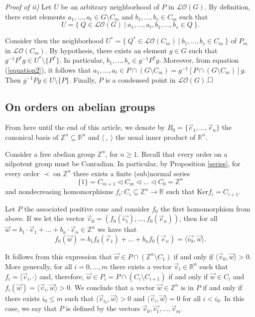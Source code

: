 \documentclass[12pt]{article}
\theoremstyle{definition}
\begin{document}
    \textit{Proof of ii)} Let $U$ be an arbitrary neighborhood of $P$ in $\mathcal{LO}(G)$. By definition, there exist elements $a_1,\dots, a_t\in G\setminus C_m$ and $b_1,\dots, b_s\in C_m$ such that
    $$U=\{\ Q\in \mathcal{LO}(G)\ |\ a_1,\dots, a_t,b_1,\dots, b_s\in Q\ \}.$$

    Consider then the neighborhood $U^*=\{\ Q^*\in\mathcal{LO}(C_m)\ |\ b_1,\dots, b_s\in C_m\ \}$ of $P_m$ in $\mathcal{LO}(C_m)$. 
    By hypothesis, there exists an element $g\in G$ such that $g^{-1}P^*g\in U^*\setminus\{P^*\}$. In particular, $b_1,\dots, b_s\in g^{-1}P^*g$.     
    Moreover, from equation (\ref{equation2}), it follows that $a_1,\dots, a_t\in P\cap (G\setminus C_m)=g^{-1}[P\cap(G\setminus C_m) ]g$. Then $g^{-1}Pg\in U\setminus\{P\}$. Finally, $P$ is a condensed point in $\mathcal{LO}(G)$.$\hfill\square$

\subsection{On orders on abelian groups}

\indent From here until the end of this article, we denote by $B_0=\{\vec{e}_1,\dots, \vec{e}_n\}$ the canonical basis of $\mathbb{Z}^n\subseteq \mathbb{R}^n$ and $\langle\ ,\ \rangle$ the usual inner product of $\mathbb{R}^n$.

Consider a free abelian group $\mathbb{Z}^n$, for $n\geq1$. 
Recall that every order on a nilpotent group must be Conradian. In particular, by Proposition \ref{series}, for every order $\prec$ on $\mathbb{Z}^n$ there exists a finite (sub)normal series $$\{1\}=C_{m+1}\vartriangleleft C_m\vartriangleleft\dots \vartriangleleft  C_0=\mathbb{Z}^n$$
and nondecreasing homomorphisms $f_i:C_i\subseteq \mathbb{Z}^n\rightarrow \mathbb{R}$ such that Ker$f_i=C_{i+1}$.

Let $P$ the associated positive cone and consider $f_0$ the first homomorphism from above. If we let the vector $\vec{v}_0=(f_0(\vec{e_1}),\dots, f_0(\vec{e}_n))$, then for all $\vec{w}=b_1\cdot\vec{e}_1+\dots+ b_n\cdot \vec{e}_n\in \mathbb{Z}^n$ we have that
$$f_0(\vec{w})=b_1f_0(\vec{e}_1)+\dots + b_nf_0(\vec{e}_n)=\langle\vec{v_0},\vec{w}\rangle.$$

It follows from this expression that $\vec{w}\in P\cap (\mathbb{Z}^n\setminus C_1)$ if and only if $\langle\vec{v}_0,\vec{w}\rangle>0$.
More generally, for all $i=0,\dots, m$ there exists a vector $\vec{v}_i\in \mathbb{R}^n$ such that $f_i=\langle\vec{v}_i, \cdot\rangle$ and, therefore, $\vec{w}\in P_i=P\cap (C_i\setminus C_{i+1})$ if and only if $\vec{w}\in C_i$ and $f_i(\vec{w})=\langle \vec{v}_i,\vec{w}\rangle>0.$
We conclude that a vector $\vec{w}\in \mathbb{Z}^n$ is in $P$ if and only if there exists $i_0\leq m$ such that $\langle \vec{v}_{i_0},\vec{w}\rangle>0$ and $\langle\vec{v}_i,\vec{w}\rangle=0$ for all $i<i_0$. %
In this case, we say that $P$ is defined by the vectors $\vec{v}_0,\vec{v_1},\dots, \vec{v}_m$.
\end{document}
